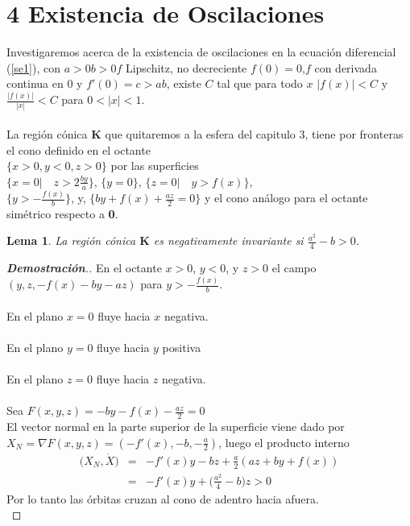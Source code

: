 \documentclass[letter]{article}
\newtheorem{lem}{Lema}
\begin{document}
\section{4 Existencia de Oscilaciones}
 
\color{black}Investigaremos acerca de la existencia de
oscilaciones en la ecuaci{\'o}n diferencial (\ref{se1}), con
$a>0$\quad $b>0$\quad $f$ Lipschitz, no decreciente\quad
$f(0)=0$,\quad $f$ con derivada continua en 0 y $f'(0)=c>ab$,
 existe $C$ tal que para todo $x$ \quad $|f(x)|<C$ y
$\displaystyle{\frac{|f(x)|}{|x|}}<C$ para $0<|x|<1$.
\\
\\
La regi{\'o}n c{\'o}nica $\mathbf{K}$ que quitaremos a la
esfera del capitulo 3, tiene por fronteras el cono definido en el octante\\
$\{ x>0, y<0, z>0\}$ por las
superficies \\
$\{x=0|\quad z>2\frac{by}{a} \}$, $\{y=0\}$, $\{z=0|\quad
y>f(x)\}$, \\
$\{y>-\displaystyle{\frac{f(x)}{b}}\}$, y,
$\{by+f(x)+\displaystyle{\frac{az}{2}}=0\}$ y el cono an{\'a}logo para
el octante sim{\'e}trico respecto a {\bf 0}.
\begin{lem}\label{lcono2}
La regi{\'o}n c{\'o}nica $\mathbf{K}$ es negativamente invariante si
$\displaystyle{\frac{a^2}{4}}-b>0$.
\end{lem}
\begin{proof}[{\bf Demostraci{\'o}n}.]
En el octante $x>0$,  $y<0$, y $z>0$ el campo $(y,z,-f(x)-by-az)$
para $y>-\displaystyle{\frac{f(x)}{b}}$.
\\
\\
En el plano $x=0$ fluye hacia $x$ negativa.\\
\\
En el plano $y=0$ fluye hacia $y$ positiva
\\
\\
En el plano $z=0$ fluye hacia $z$ negativa.
\\
\\
Sea $F(x,y,z)=-by-f(x)-\displaystyle{\frac{az}{2}}=0$
\\
El vector normal en la parte superior de la superficie viene dado
por $X_N=\nabla F(x,y,z)=(-f'(x),-b,-\displaystyle{\frac{a}{2}})$,
luego el producto interno\\
\begin{displaymath}
\begin{array}{lcl}
\Big(X_N,\dot{X}\Big)&=&-f'(x)y-bz+\displaystyle{\frac{a}{2}}(az+by+f(x))\\
                     &=&-f'(x)y+\big(\displaystyle{\frac{a^2}{4}}-b\big)z>0
\end{array}
\end{displaymath}
Por lo tanto  las {\'o}rbitas cruzan al cono de adentro hacia afuera.
\\
\end{proof}
\end{document}
